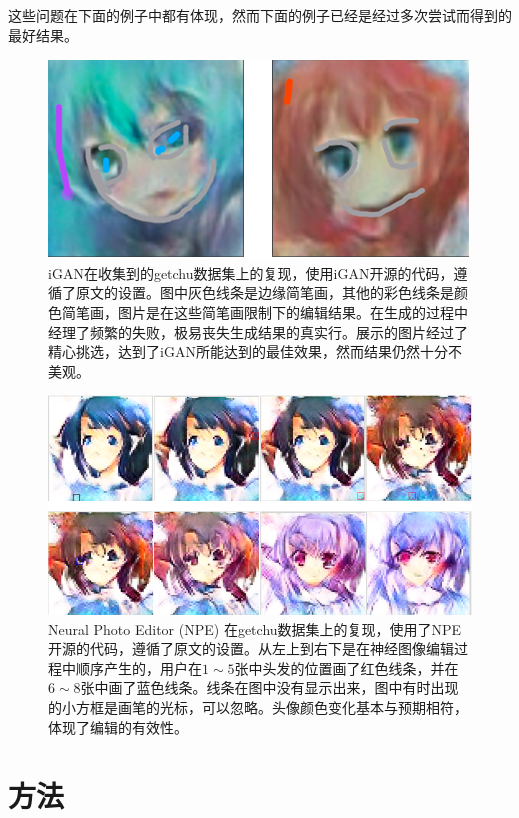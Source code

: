 \documentclass[a4paper,12pt,UTF8]{ctexart}
\newcommand{\kai}{\CJKfamily{zhkai}}	%
\begin{document}
这些问题在下面的例子中都有体现，然而下面的例子已经是经过多次尝试而得到的最好结果。

\begin{figure}[H]
  \centering
  \includegraphics[width=0.9\linewidth]{figs/baseline1.PNG}
  \caption{\kai iGAN在收集到的getchu数据集上的复现，使用iGAN开源的代码，遵循了原文的设置。图中灰色线条是边缘简笔画，其他的彩色线条是颜色简笔画，图片是在这些简笔画限制下的编辑结果。在生成的过程中经理了频繁的失败，极易丧失生成结果的真实行。展示的图片经过了精心挑选，达到了iGAN所能达到的最佳效果，然而结果仍然十分不美观。}
  \label{fig:baseline1}
\end{figure}

\begin{figure}[H]
  \centering
  \includegraphics[width=0.9\linewidth]{figs/baseline2.PNG}
  \caption{\kai Neural Photo Editor (NPE) 在getchu数据集上的复现，使用了NPE开源的代码，遵循了原文的设置。从左上到右下是在神经图像编辑过程中顺序产生的，用户在$1\sim5$张中头发的位置画了红色线条，并在 $6\sim8$张中画了蓝色线条。线条在图中没有显示出来，图中有时出现的小方框是画笔的光标，可以忽略。头像颜色变化基本与预期相符，体现了编辑的有效性。}
  \label{fig:baseline2}
\end{figure}

\section{方法}
\end{document}
